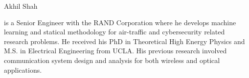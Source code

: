 \documentclass[conference]{IEEEtran}
\begin{document}


%
%
%
\vspace*{-2\baselineskip}
\begin{IEEEbiographynophoto}{Akhil Shah}

is a Senior Engineer with the RAND Corporation where he develops machine learning and statical methodology for air-traffic and cybersecurity related research problems.  He received his PhD in Theoretical High Energy Physics and M.S. in Electrical Engineering from UCLA.  His previous research involved communication system design and analysis for both wireless and optical applications.  
\end{IEEEbiographynophoto}




\end{document}
